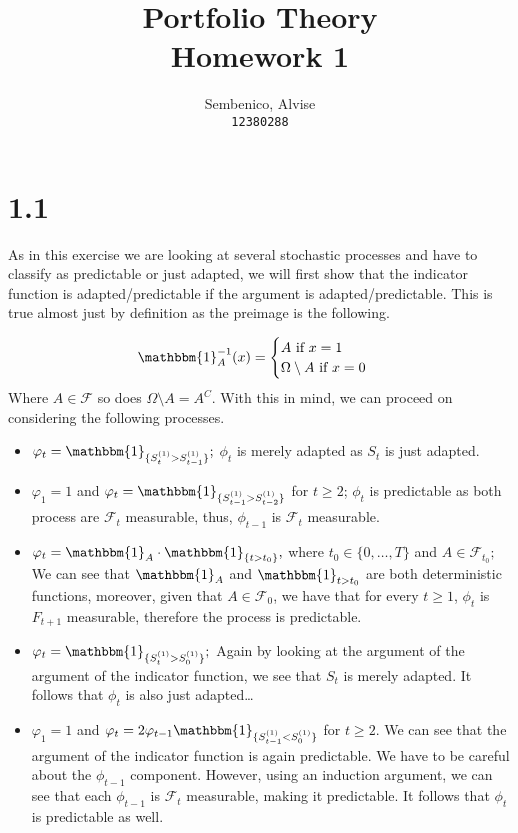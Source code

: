 \documentclass{article}
\title{Portfolio Theory\\
Homework 1}
\author{
  Sembenico, Alvise\\
  \texttt{12380288} \\  
}
\date{}
\begin{document}
\maketitle

\section{1.1}
As in this exercise we are looking at several stochastic processes and have to classify as predictable or just adapted, we will first show that the indicator function is adapted/predictable if the argument is adapted/predictable.
This is true almost just by definition as the preimage is the following.

\begin{equation}
  \mathbbm{1}_{A}^{-1}(x) = \begin{cases}
    A \text{ if }x=1                  \\
    \Omega \setminus A \text{ if }x=0 \\
  \end{cases}
\end{equation}
Where \(A \in  \mathcal{F}\) so does \(\Omega \setminus A = A^C\).
With this in mind, we can proceed on considering the following processes.
\begin{itemize}
  \item $\varphi_t = \mathbbm{1}_{\{ S_t^{(1)} > S_{t-1}^{(1)} \}};$
        \subitem \(\phi _t\) is merely adapted as \(S_t\) is just adapted.

  \item $\varphi_1 = 1$ and $\varphi_t = \mathbbm{1}_{\{ S_{t-1}^{(1)} > S_{t-2}^{(1)} \}}$ for $t \geq 2$;
        \subitem \(\phi_t\) is predictable as both process are \(\mathcal{F}_t\) measurable, thus, \(\phi _{t-1}\) is \(\mathcal{F}_t\) measurable.

  \item $\varphi_t = \mathbbm{1}_A \cdot \mathbbm{1}_{\{ t > t_0 \}},$ where $t_0 \in \{ 0, \dots, T \}$ and $A \in \mathcal{F}_{t_0};$
        \subitem We can see that \( \mathbbm{1}_A\) and \( \mathbbm{1}_{t>t_0}\) are both deterministic functions, moreover, given that \(A \in  \mathcal{F}_0\), we have that for every \(t\geq 1\), \(\phi _t\) is \(F_{t+1}\) measurable, therefore the process is predictable.

  \item $\varphi_t = \mathbbm{1}_{\{ S_t^{(1)} > S_0^{(1)} \}};$
        \subitem Again by looking at the argument of the argument of the indicator function, we see that \(S_t\) is merely adapted. It follows that \(\phi _t \) is also just adapted\dots

  \item $\varphi_1 = 1$ and $\varphi_t = 2 \varphi_{t-1} \mathbbm{1}_{\{ S_{t-1}^{(1)} < S_0^{(1)} \}}$ for $t \geq 2.$
        \subitem We can see that the argument of the indicator function is again predictable. We have to be careful about the \(\phi _{t-1}\) component. However, using an induction argument, we can see that each \(\phi _{t-1}\) is \(\mathcal{F}_{t}\) measurable, making it predictable. It follows that \(\phi _t \) is predictable as well.
\end{itemize}


\section{}
\end{document}
